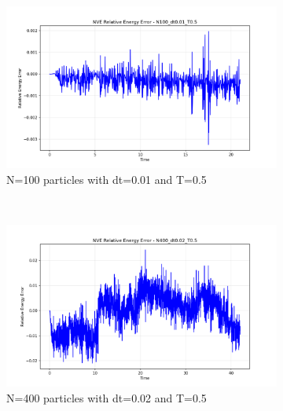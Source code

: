 \begin{figure}[H]
	\centering
	\begin{subfigure}{0.5\textwidth}
		\includegraphics[width=\textwidth]{media/error_N100_dt0.01_T0.5.png}
		\caption{N=100 particles with dt=0.01 and T=0.5}
		\label{sfig:error_N100}
	\end{subfigure}%
	~
	\begin{subfigure}{0.5\textwidth}
		\includegraphics[width=\textwidth]{media/error_N400_dt0.02_T0.5.png}
		\caption{N=400 particles with dt=0.02 and T=0.5}
		\label{sfig:error_N400_dt002}
	\end{subfigure}%
	\\
	\begin{subfigure}{0.5\textwidth}

\end{subfigure}
\end{figure}

